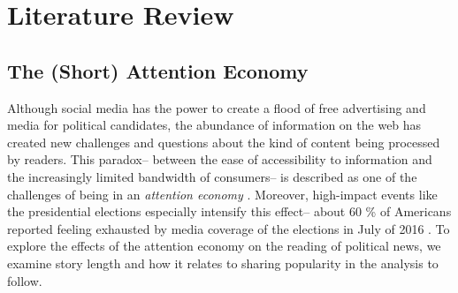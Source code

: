 \documentclass[letterpaper]{article}
\begin{document}
\section{Literature Review}

  
\subsection{The (Short) Attention Economy}
Although social media has the power to create a flood of free advertising and media for political candidates, the abundance of information on the web has created new challenges and questions about the kind of content being processed by readers. This paradox-- between the ease of accessibility to information and the increasingly limited bandwidth of consumers-- is described as one of the challenges of being in an \emph{attention economy} \cite{goldhaber1997attention}. Moreover, high-impact events like the presidential elections especially intensify this effect-- about 60 \% of Americans reported feeling exhausted by media coverage of the elections in July of 2016 \cite{election-fatigue}. To explore the effects of the attention economy on the reading of political news, we examine story length and how it relates to sharing popularity in the analysis to follow.
 
\end{document}

